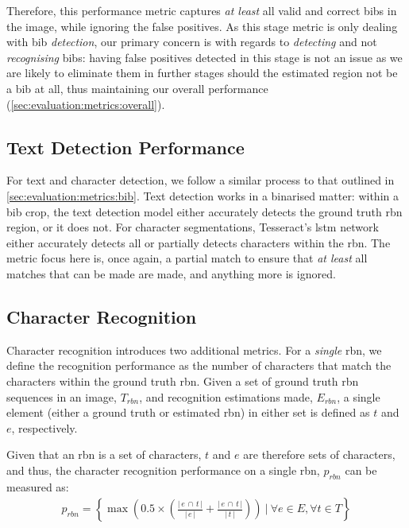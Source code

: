 \noindent
Therefore, this performance metric captures \textit{at least} all valid and correct bibs in the image, while ignoring the false positives. As this stage metric is only dealing with bib \textit{detection}, our primary concern is with regards to \textit{detecting} and not \textit{recognising} bibs: having false positives detected in this stage is not an issue as we are likely to eliminate them in further stages should the estimated region not be a bib at all, thus maintaining our overall performance (\cref{sec:evaluation:metrics:overall}).

\subsection{Text Detection Performance}

For text and character detection, we follow a similar process to that outlined in \cref{sec:evaluation:metrics:bib}. Text detection works in a binarised matter: within a bib crop, the text detection model either accurately detects the ground truth \gls{rbn} region, or it does not. For character segmentations, Tesseract's \gls{lstm} network either accurately detects all or partially detects characters within the \gls{rbn}. The metric focus here is, once again, a partial match to ensure that \textit{at least} all matches that can be made are made, and anything more is ignored.

\subsection{Character Recognition}

Character recognition introduces two additional metrics. For a \textit{single} \gls{rbn}, we define the recognition performance as the number of characters that match the characters within the ground truth \gls{rbn}. Given a set of ground truth \gls{rbn} sequences in an image, $T_{rbn}$, and recognition estimations made, $E_{rbn}$, a single element (either a ground truth or estimated \gls{rbn}) in either set is defined as $t$ and $e$, respectively.

Given that an \gls{rbn} is a set of characters, $t$ and $e$ are therefore sets of characters, and thus, the character recognition performance on a single \gls{rbn}, $p_{rbn}$ can be measured as:
\begin{align*}
  p_{rbn} = \left\{ \max \left(0.5 \times \left(\frac{\lvert\,e\,\cap\,t\,\rvert}{\lvert\,e\,\rvert} + \frac{\lvert\,e\,\cap\,t\,\rvert}{\lvert\,t\,\rvert} \right) \right)\ |\ \forall e \in E, \forall t \in T \right\}
\end{align*}

